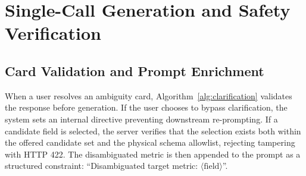 \section{Single-Call Generation and Safety Verification}
\label{sec:safety}



\subsection{Card Validation and Prompt Enrichment}
When a user resolves an ambiguity card, Algorithm~\ref{alg:clarification} validates the response before generation. If the user chooses to bypass clarification, the system sets an internal directive preventing downstream re-prompting. If a candidate field is selected, the server verifies that the selection exists both within the offered candidate set and the physical schema allowlist, rejecting tampering with HTTP 422. The disambiguated metric is then appended to the prompt as a structured constraint: ``Disambiguated target metric: $\langle\text{field}\rangle$''.



